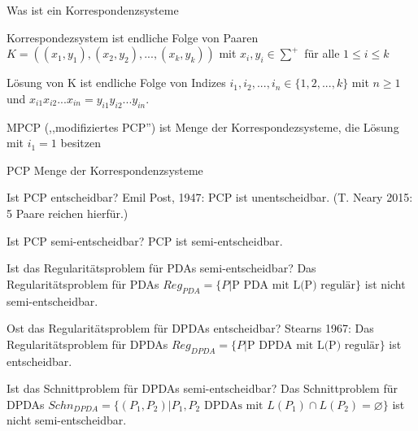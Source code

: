 \documentclass[avery5371, frame]{flashcards}
\begin{document}
\begin{flashcard}[Definition]{Was ist ein Korrespondenzsysteme}
    \begin{enumerate*}
        \item Korrespondezsystem ist endliche Folge von Paaren $K=((x_1,y_1),(x_2,y_2),...,(x_k,y_k))$ mit $x_i,y_i\in\sum^+$ für alle $1\leq i \leq k$ %
        \item Lösung von K ist endliche Folge von Indizes $i_1,i_2,...,i_n \in \{1,2,...,k\}$ mit $n\geq 1$ und $x_{i1} x_{i2} ... x_{in}=y_{i1} y_{i2}... y_{in}$.
        \item MPCP (,,modifiziertes PCP'') ist Menge der Korrespondezsysteme, die Lösung mit $i_1=1$ besitzen
        \item PCP Menge der Korrespondenzsysteme%
    \end{enumerate*}
\end{flashcard}

\begin{flashcard}[Satz]{Ist PCP entscheidbar?}
    Emil Post, 1947: PCP ist unentscheidbar. (T. Neary 2015: 5 Paare reichen hierfür.)
\end{flashcard}

\begin{flashcard}[Satz]{Ist PCP semi-entscheidbar?}
    PCP ist semi-entscheidbar.
\end{flashcard}

\begin{flashcard}[Satz]{Ist das Regularitätsproblem für PDAs semi-entscheidbar?}
    Das Regularitätsproblem für PDAs $Reg_{PDA} = \{P | \text{P PDA mit L(P) regulär}\}$ ist nicht semi-entscheidbar.
\end{flashcard}

\begin{flashcard}[Satz]{Ost das Regularitätsproblem für DPDAs entscheidbar?}
    Stearns 1967: Das Regularitätsproblem für DPDAs $Reg_{DPDA} = \{ P | \text{P DPDA mit L(P) regulär}\}$ ist entscheidbar.
\end{flashcard}

\begin{flashcard}[Satz]{Ist das Schnittproblem für DPDAs semi-entscheidbar?}
    Das Schnittproblem für DPDAs $Schn_{DPDA} = \{(P_1, P_2 ) | P_1, P_2 \text{ DPDAs mit } L(P_1)\cap L(P_2) = \varnothing\}$ ist nicht semi-entscheidbar.
\end{flashcard}
\end{document}
